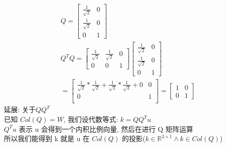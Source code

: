 \documentclass[12pt]{article}
\begin{document}
\begin{flushleft}
\begin{align}
        Q = \begin{bmatrix}
                \frac{1}{\sqrt{2}} & 0 \\
                \frac{1}{\sqrt{2}} & 0 \\
                0                  & 1
            \end{bmatrix}                                        \\
        Q^{T}Q =\begin{bmatrix}
                    \frac{1}{\sqrt{2}} & \frac{1}{\sqrt{2}} & 0 \\
                    0                  & 0                  & 1
                \end{bmatrix}\begin{bmatrix}
                                 \frac{1}{\sqrt{2}} & 0 \\
                                 \frac{1}{\sqrt{2}} & 0 \\
                                 0                  & 1
                             \end{bmatrix} \\
        = \begin{bmatrix}
              \frac{1}{\sqrt{2}} * \frac{1}{\sqrt{2}} + \frac{1}{\sqrt{2}}* \frac{1}{\sqrt{2}} + 0 & 0 \\
              0                                                                                    & 1 \\
          \end{bmatrix}
        = \begin{bmatrix}
              1 & 0 \\
              0 & 1
          \end{bmatrix}
    \end{align}
    延展: 关于$QQ^{T}$ \\
    已知 $Col(Q) = W$, 我们设代数等式: $ k = QQ^{T}u$ \\
    $Q^{T}u$ 表示 u 会得到一个内积比例向量, 然后在进行 Q 矩阵运算 \\
    所以我们能得到 k 就是 u 在 $Col(Q)$ 的投影($k \in \mathbb{R}^{3 \times 1}  \land  k \in Col(Q)$)\\


\end{flushleft}
\end{document}

